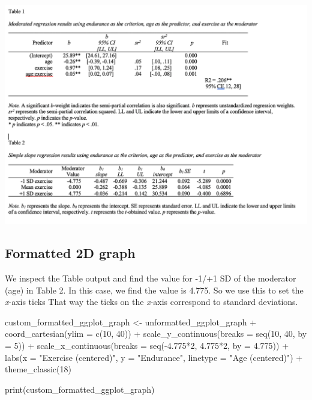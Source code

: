 \documentclass[
]{krantz}
\makeatletter
\newenvironment{Shaded}{\begin{snugshade}}{\end{snugshade}}
\newcommand{\AttributeTok}[1]{\textcolor[rgb]{0.61,0.61,0.61}{#1}}
\newcommand{\DecValTok}[1]{\textcolor[rgb]{0.06,0.06,0.06}{#1}}
\newcommand{\FloatTok}[1]{\textcolor[rgb]{0.06,0.06,0.06}{#1}}
\newcommand{\FunctionTok}[1]{\textcolor[rgb]{0,0,0}{#1}}
\newcommand{\NormalTok}[1]{#1}
\newcommand{\OtherTok}[1]{\textcolor[rgb]{0.37,0.37,0.37}{#1}}
\newcommand{\SpecialCharTok}[1]{\textcolor[rgb]{0,0,0}{#1}}
\newcommand{\StringTok}[1]{\textcolor[rgb]{0.5,0.5,0.5}{#1}}
\newenvironment{kframe}{%
\medskip{}
\setlength{\fboxsep}{.8em}
 \def\at@end@of@kframe{}%
 \ifinner\ifhmode%
  \def\at@end@of@kframe{\end{minipage}}%
  \begin{minipage}{\columnwidth}%
 \fi\fi%
 \def\FrameCommand##1{\hskip\@totalleftmargin \hskip-\fboxsep
 \colorbox{shadecolor}{##1}\hskip-\fboxsep
     \hskip-\linewidth \hskip-\@totalleftmargin \hskip\columnwidth}%
 \MakeFramed {\advance\hsize-\width
   \@totalleftmargin\z@ \linewidth\hsize
   \@setminipage}}%
 {\par\unskip\endMakeFramed%
 \at@end@of@kframe}
\renewenvironment{Shaded}{\begin{kframe}}{\end{kframe}}
\makeatother
\begin{document}
\includegraphics[width=0.8\linewidth]{ch_mmr/images/tables_apa}

\hypertarget{formatted-2d-graph}{%
\subsection{Formatted 2D graph}\label{formatted-2d-graph}}

We inspect the Table output and find the value for -1/+1 SD of the moderator (age) in Table 2. In this case, we find the value is 4.775. So we use this to set the \emph{x}-axis ticks That way the ticks on the \emph{x}-axis correspond to standard deviations.

\begin{Shaded}
\begin{Highlighting}[]
\NormalTok{custom\_formatted\_ggplot\_graph }\OtherTok{\textless{}{-}}\NormalTok{ unformatted\_ggplot\_graph }\SpecialCharTok{+}
  \FunctionTok{coord\_cartesian}\NormalTok{(}\AttributeTok{ylim =} \FunctionTok{c}\NormalTok{(}\DecValTok{10}\NormalTok{, }\DecValTok{40}\NormalTok{)) }\SpecialCharTok{+}
  \FunctionTok{scale\_y\_continuous}\NormalTok{(}\AttributeTok{breaks =} \FunctionTok{seq}\NormalTok{(}\DecValTok{10}\NormalTok{, }\DecValTok{40}\NormalTok{, }\AttributeTok{by =} \DecValTok{5}\NormalTok{)) }\SpecialCharTok{+}
  \FunctionTok{scale\_x\_continuous}\NormalTok{(}\AttributeTok{breaks =} \FunctionTok{seq}\NormalTok{(}\SpecialCharTok{{-}}\FloatTok{4.775}\SpecialCharTok{*}\DecValTok{2}\NormalTok{, }\FloatTok{4.775}\SpecialCharTok{*}\DecValTok{2}\NormalTok{, }\AttributeTok{by =} \FloatTok{4.775}\NormalTok{)) }\SpecialCharTok{+}
  \FunctionTok{labs}\NormalTok{(}\AttributeTok{x =} \StringTok{"Exercise (centered)"}\NormalTok{,}
       \AttributeTok{y =} \StringTok{"Endurance"}\NormalTok{,}
       \AttributeTok{linetype =} \StringTok{"Age (centered)"}\NormalTok{) }\SpecialCharTok{+}
  \FunctionTok{theme\_classic}\NormalTok{(}\DecValTok{18}\NormalTok{)}

\FunctionTok{print}\NormalTok{(custom\_formatted\_ggplot\_graph)}
\end{Highlighting}
\end{Shaded}
\end{document}
